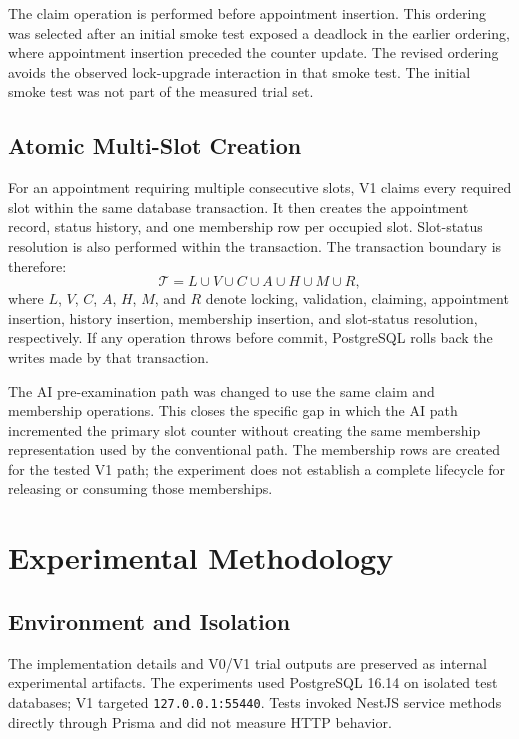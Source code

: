 \documentclass[conference]{IEEEtran}
\begin{document}
The claim operation is performed before appointment insertion. This ordering was selected after an initial smoke test exposed a deadlock in the earlier ordering, where appointment insertion preceded the counter update. The revised ordering avoids the observed lock-upgrade interaction in that smoke test. The initial smoke test was not part of the measured trial set.

\subsection{Atomic Multi-Slot Creation}
For an appointment requiring multiple consecutive slots, V1 claims every required slot within the same database transaction. It then creates the appointment record, status history, and one membership row per occupied slot. Slot-status resolution is also performed within the transaction. The transaction boundary is therefore:
\begin{equation}
\mathcal{T}=L\cup V\cup C\cup A\cup H\cup M\cup R,
\label{eq:transaction}
\end{equation}
where $L$, $V$, $C$, $A$, $H$, $M$, and $R$ denote locking, validation, claiming, appointment insertion, history insertion, membership insertion, and slot-status resolution, respectively.
If any operation throws before commit, PostgreSQL rolls back the writes made by that transaction.

The AI pre-examination path was changed to use the same claim and membership operations. This closes the specific gap in which the AI path incremented the primary slot counter without creating the same membership representation used by the conventional path. The membership rows are created for the tested V1 path; the experiment does not establish a complete lifecycle for releasing or consuming those memberships.

\section{Experimental Methodology}
\subsection{Environment and Isolation}
The implementation details and V0/V1 trial outputs are preserved as internal experimental artifacts. The experiments used PostgreSQL 16.14 on isolated test databases; V1 targeted \texttt{127.0.0.1:55440}. Tests invoked NestJS service methods directly through Prisma and did not measure HTTP behavior.
\end{document}
